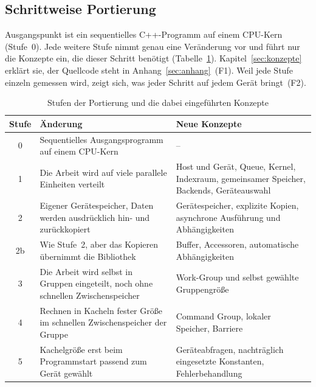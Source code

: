 \documentclass[12pt,a4paper]{article}
\begin{document}
\subsection{Schrittweise Portierung}\label{sec:m-portierung}

Ausgangspunkt ist ein sequentielles C++-Programm auf einem CPU-Kern (Stufe~0).
Jede weitere Stufe nimmt genau eine Veränderung vor und führt nur die Konzepte
ein, die dieser Schritt benötigt (Tabelle~\ref{tab:stufen}).
Kapitel~\ref{sec:konzepte} erklärt sie, der Quellcode steht in
Anhang~\ref{sec:anhang}~(F1). Weil jede Stufe einzeln gemessen wird, zeigt sich,
was jeder Schritt auf jedem Gerät bringt~(F2).

\begin{table}[htbp]
\centering
\footnotesize
\caption[Stufen der Portierung und eingeführte Konzepte]{Stufen der Portierung und die dabei eingeführten Konzepte}
\label{tab:stufen}
\begin{tabularx}{\textwidth}{@{}c>{\raggedright\arraybackslash}X>{\raggedright\arraybackslash}X@{}}
\toprule
Stufe & Änderung & Neue Konzepte \\
\midrule
0 & Sequentielles Ausgangsprogramm auf einem CPU-Kern & -- \\
1 & Die Arbeit wird auf viele parallele Einheiten verteilt & Host und Gerät, Queue, Kernel, Indexraum, gemeinsamer Speicher, Backends, Geräteauswahl \\
2 & Eigener Gerätespeicher, Daten werden ausdrücklich hin- und zurückkopiert & Gerätespeicher, explizite Kopien, asynchrone Ausführung und Abhängigkeiten \\
2b & Wie Stufe~2, aber das Kopieren übernimmt die Bibliothek & Buffer, Accessoren, automatische Abhängigkeiten \\
3 & Die Arbeit wird selbst in Gruppen eingeteilt, noch ohne schnellen Zwischenspeicher & Work-Group und selbst gewählte Gruppengröße \\
4 & Rechnen in Kacheln fester Größe im schnellen Zwischenspeicher der Gruppe & Command Group, lokaler Speicher, Barriere \\
5 & Kachelgröße erst beim Programmstart passend zum Gerät gewählt & Geräteabfragen, nachträglich eingesetzte Konstanten, Fehlerbehandlung \\
\bottomrule
\end{tabularx}
\end{table}
\end{document}
